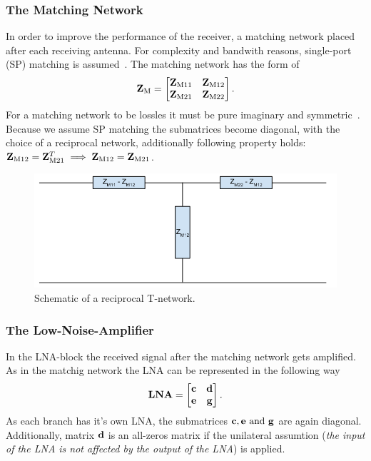 \subsubsection{The Matching Network}
\label{sec:matching_network}
In order to improve the performance of the receiver, a matching network placed after each receiving antenna.
For complexity and bandwith reasons, single-port (SP) matching is assumed~\cite{Yahia2013}.
The matching network has the form of 
\begin{equation}
\mathbf{Z}_\text{M}=
\begin{bmatrix}
\mathbf{Z}_\text{M11} & \mathbf{Z}_\text{M12} \\
\mathbf{Z}_\text{M21} & \mathbf{Z}_\text{M22}
\end{bmatrix}.
\end{equation}
For a matching network to be lossles it must be pure imaginary and symmetric~\cite{Nossek}.
Because we assume SP matching the submatrices become diagonal, with the choice of a reciprocal network, additionally following property holds: $\mathbf{Z}_\text{M12} = \mathbf{Z}_\text{M21}^T \implies \mathbf{Z}_\text{M12} = \mathbf{Z}_\text{M21}$.
\begin{figure}[h]
\centering
  \includegraphics[width=0.7\linewidth]{images/T-Network.png}
\caption{Schematic of a reciprocal T-network.}
\label{fig:t_netw}
\end{figure}

\subsubsection{The Low-Noise-Amplifier}
\label{sec:lna}
In the LNA-block the received signal after the matching network gets amplified.
As in the matchig network the LNA can be represented in the following way
\begin{equation}
\mathbf{LNA}=
\begin{bmatrix}
\mathbf{c} & \mathbf{d} \\
\mathbf{e} & \mathbf{g}
\end{bmatrix}.
\end{equation}
As each branch has it's own LNA, the submatrices $\mathbf{c},\mathbf{e}\text{ and }\mathbf{g}$ are again diagonal.
Additionally, matrix $\mathbf{d}$ is an all-zeros matrix if the unilateral assumtion (\textit{the input of the LNA is not affected by the output of the LNA}) is applied.

